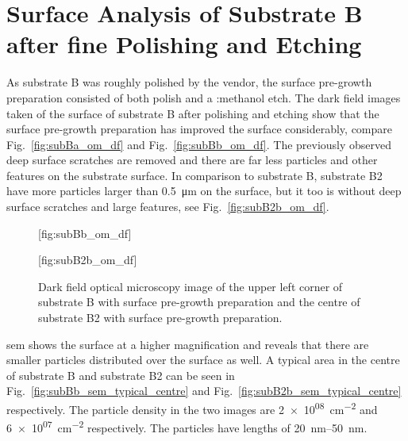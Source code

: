 \clearpage
   
\section{Surface Analysis of Substrate B after fine Polishing and Etching}

As substrate B was roughly polished by the vendor, the surface pre-growth preparation consisted of both polish and a :methanol etch. The dark field images taken of the surface of substrate B after polishing and etching show that the surface pre-growth preparation has improved the surface considerably, compare Fig.~\ref{fig:subBa_om_df} and Fig.~\ref{fig:subBb_om_df}. The previously observed deep surface scratches are removed and there are far less particles and other features on the substrate surface. In comparison to substrate B, substrate B2 have more particles larger than \SI{0.5}{\micro\metre} on the surface, but it too is without deep surface scratches and large features, see Fig.~\ref{fig:subB2b_om_df}.

\begin{figure}[htbp]
    \centering
    [fig:subBb_om_df]
    \par\bigskip
    [fig:subB2b_om_df]
    \caption[Dark field optical microscopy image of substrate B and B2 with surface pre-growth preparation.]{Dark field optical microscopy image of  the upper left corner of substrate B with surface pre-growth preparation and  the centre of substrate B2 with surface pre-growth preparation.}\label{fig:subBb_and_subB2b_om_df}
\end{figure}

\Ac{sem} shows the surface at a higher magnification and reveals that there are smaller particles distributed over the surface as well. A typical area in the centre of substrate B and substrate B2 can be seen in Fig.~\ref{fig:subBb_sem_typical_centre} and Fig.~\ref{fig:subB2b_sem_typical_centre} respectively. The particle density in the two images are \SI{2e+08}{\centi\metre^{-2}} and \SI{6e+07}{\centi\metre^{-2}} respectively. The particles have lengths of \SIrange{20}{50}{\nano\metre}. 

